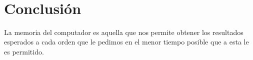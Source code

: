 \documentclass{article}
\begin{document}
\begin{lstlisting}
    
\end{lstlisting}


\section{Conclusión} \label{conclulsion}
La memoria del computador es aquella que nos permite obtener los resultados esperados  a cada orden que le pedimos en el menor tiempo posible que a esta le es permitido.



\end{document}
